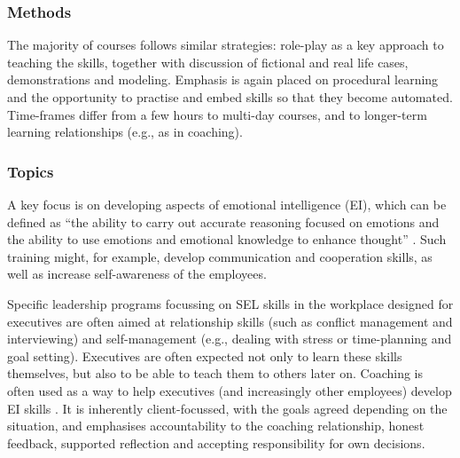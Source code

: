 \documentclass[prodmode,acmtochi]{acmsmall}
\newcommand{\GeraldineFIX}[1]{}
\begin{document}
\subsubsection*{Methods} The majority of courses follows similar strategies: role-play as a key approach to teaching the skills, together with discussion of fictional and real life cases, demonstrations and modeling. Emphasis is again placed on procedural learning and the opportunity to practise and embed skills so that they become automated. Time-frames differ from a few hours to multi-day courses, and to longer-term learning relationships (e.g., as in coaching). 

\subsubsection*{Topics} 
        A key focus is on developing aspects of emotional intelligence (EI), which can be defined as ``the ability to carry out accurate reasoning focused on emotions and the ability to use emotions and emotional knowledge to enhance thought'' \cite{Mayer2008}. Such training might, for example, develop communication and cooperation skills, as well as increase self-awareness of the employees. 
        
        Specific leadership programs focussing on SEL skills in the workplace designed for executives are often aimed at relationship skills (such as conflict management and interviewing) and self-management (e.g., dealing with stress or time-planning and goal setting). Executives are often expected not only to learn these skills themselves, but also to be able to teach them to others later on. Coaching is often used as a way to help executives (and increasingly other employees) develop EI skills \cite{Bono2009}. It is inherently client-focussed, with the goals agreed depending on the situation, and emphasises accountability to the coaching relationship, honest feedback, supported reflection and accepting responsibility for own decisions. 

\GeraldineFIX{G: Not just for executives though in the workplace - this can sound like it is only for execs?    P: That's what the reviews I found focused on ... perhaps still mainly used for execs, as very expensive to roll-out more widely? Or perhaps not that much literature on it?}
\end{document}
